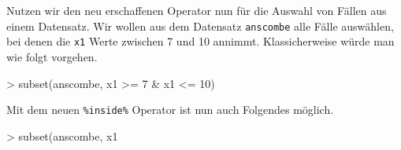\documentclass[12pt, a4paper,twoside,openany,x11names,svgnames]{memoir}
\begin{document}
Nutzen wir den neu erschaffenen Operator nun für die Auswahl von Fällen aus einem Datensatz. Wir wollen aus dem Datensatz \texttt{anscombe} alle Fälle auswählen, bei denen die \texttt{x1} Werte zwischen 7 und 10 annimmt. Klassicherweise würde man wie folgt vorgehen. 

\begin{Schunk}
\begin{Sinput}
> subset(anscombe, x1 >= 7 & x1 <= 10)
\end{Sinput}
\end{Schunk}

Mit dem neuen \texttt{\%inside\%} Operator ist nun auch Folgendes möglich.

\begin{Schunk}
\begin{Sinput}
> subset(anscombe, x1 %inside% c(7,10))
\end{Sinput}
\end{Schunk}
\end{document}
